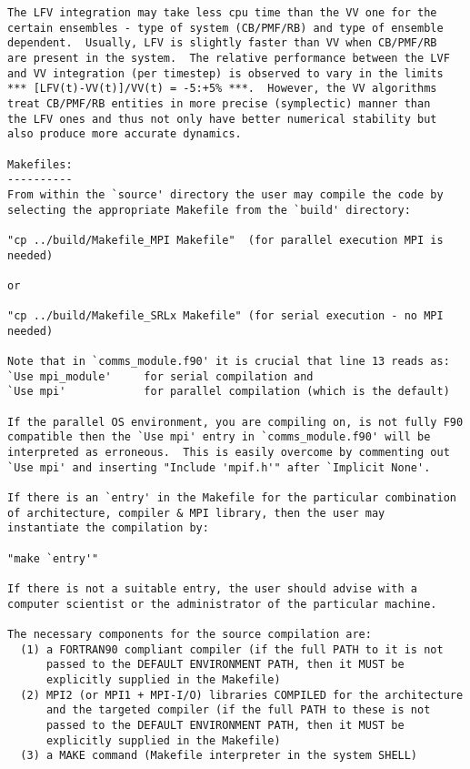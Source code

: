 \begin{verbatim}
The LFV integration may take less cpu time than the VV one for the
certain ensembles - type of system (CB/PMF/RB) and type of ensemble
dependent.  Usually, LFV is slightly faster than VV when CB/PMF/RB
are present in the system.  The relative performance between the LVF
and VV integration (per timestep) is observed to vary in the limits
*** [LFV(t)-VV(t)]/VV(t) = -5:+5% ***.  However, the VV algorithms
treat CB/PMF/RB entities in more precise (symplectic) manner than
the LFV ones and thus not only have better numerical stability but
also produce more accurate dynamics.

Makefiles:
----------
From within the `source' directory the user may compile the code by
selecting the appropriate Makefile from the `build' directory:

"cp ../build/Makefile_MPI Makefile"  (for parallel execution MPI is needed)

or

"cp ../build/Makefile_SRLx Makefile" (for serial execution - no MPI needed)

Note that in `comms_module.f90' it is crucial that line 13 reads as:
`Use mpi_module'     for serial compilation and
`Use mpi'            for parallel compilation (which is the default)

If the parallel OS environment, you are compiling on, is not fully F90
compatible then the `Use mpi' entry in `comms_module.f90' will be
interpreted as erroneous.  This is easily overcome by commenting out
`Use mpi' and inserting "Include 'mpif.h'" after `Implicit None'.

If there is an `entry' in the Makefile for the particular combination
of architecture, compiler & MPI library, then the user may
instantiate the compilation by:

"make `entry'"

If there is not a suitable entry, the user should advise with a
computer scientist or the administrator of the particular machine.

The necessary components for the source compilation are:
  (1) a FORTRAN90 compliant compiler (if the full PATH to it is not
      passed to the DEFAULT ENVIRONMENT PATH, then it MUST be
      explicitly supplied in the Makefile)
  (2) MPI2 (or MPI1 + MPI-I/O) libraries COMPILED for the architecture
      and the targeted compiler (if the full PATH to these is not
      passed to the DEFAULT ENVIRONMENT PATH, then it MUST be
      explicitly supplied in the Makefile)
  (3) a MAKE command (Makefile interpreter in the system SHELL)


\end{verbatim}

